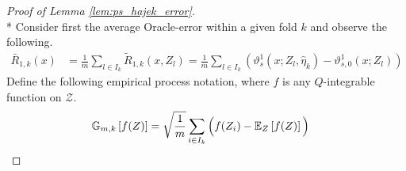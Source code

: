 \begin{proof}[Proof of Lemma \ref{lem:ps_hajek_error}]\mbox{}\\*
    Consider first the average Oracle-error within a given fold $k$ and observe the following.
    \begin{equation}
        \begin{aligned}
            \bar{R}_{1, k}\left(x\right)
            & = \frac{1}{m}\sum_{l \in I_{k}}\tilde{R}_{1, k}\left(x, Z_{l}\right)
            = \frac{1}{m}\sum_{l \in I_{k}}
            \left(\vartheta_{s}^{1}\left(x; Z_l, \hat{\eta}_{k}\right)
            - \vartheta_{s,0}^{1}\left(x; Z_l\right) 
            \right)
        \end{aligned}
    \end{equation}
    Define the following empirical process notation, where $f$ is any $Q$-integrable function on $\mathcal{Z}$.
    \begin{equation}
        \begin{aligned}
            \mathbb{G}_{m,k}\left[f(Z)\right]
            & = \sqrt{\frac{1}{m}} \sum_{i \in I_{k}} \Big(f(Z_i) - \E_{Z}\left[f(Z)\right]\Big)

\end{aligned}
\end{equation}
\end{proof}
